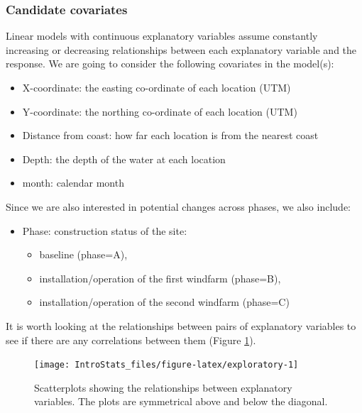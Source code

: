 \documentclass[
  oneside]{krantz}
\providecommand{\tightlist}{%
  \setlength{\itemsep}{0pt}\setlength{\parskip}{0pt}}
\begin{document}
\hypertarget{candidate-covariates}{%
\subsubsection{Candidate covariates}\label{candidate-covariates}}

Linear models with continuous explanatory variables assume constantly increasing or decreasing relationships between each explanatory variable and the response. We are going to consider the following covariates in the model(s):

\begin{itemize}
\tightlist
\item
  X-coordinate: the easting co-ordinate of each location (UTM)
\item
  Y-coordinate: the northing co-ordinate of each location (UTM)
\item
  Distance from coast: how far each location is from the nearest coast
\item
  Depth: the depth of the water at each location
\item
  month: calendar month
\end{itemize}

Since we are also interested in potential changes across phases, we also include:

\begin{itemize}
\item
  Phase: construction status of the site:

  \begin{itemize}
  \tightlist
  \item
    baseline (phase=A),
  \item
    installation/operation of the first windfarm (phase=B),
  \item
    installation/operation of the second windfarm (phase=C)
  \end{itemize}
\end{itemize}

It is worth looking at the relationships between pairs of explanatory variables to see if there are any correlations between them (Figure \ref{fig:exploratory}).

\begin{figure}

{\centering \texttt{[image: IntroStats\_files/figure-latex/exploratory-1]} 

}

\caption{Scatterplots showing the relationships between explanatory variables. The plots are symmetrical above and below the diagonal.}\label{fig:exploratory}
\end{figure}
\end{document}
